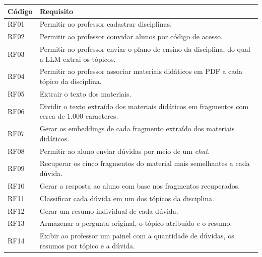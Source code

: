 \begin{quadro}[H]\captionsetup{name=Quadro}
\centering
\caption{Requisitos funcionais}
\label{quad:requisitos-funcionais}

\renewcommand{\arraystretch}{1.3}
\setlength{\tabcolsep}{4pt}

\begin{tabularx}{\textwidth}{
|>{\centering\arraybackslash}m{1.5cm}
|>{\raggedright\arraybackslash}X|
}
\hline

\rowcolor[HTML]{C0C0C0}
\textbf{Código} &
\textbf{Requisito} \\ \hline

RF01 & Permitir ao professor cadastrar disciplinas. \\ \hline

RF02 & Permitir ao professor convidar alunos por código de acesso. \\ \hline

RF03 & Permitir ao professor enviar o plano de ensino da disciplina, do qual a LLM extrai os tópicos. \\ \hline

RF04 & Permitir ao professor associar materiais didáticos em PDF a cada tópico da disciplina. \\ \hline

RF05 & Extrair o texto dos materiais. \\ \hline

RF06 & Dividir o texto extraído dos materiais didáticos em fragmentos com cerca de 1.000 caracteres. \\ \hline

RF07 & Gerar os embeddings de cada fragmento extraído dos materiais didáticos. \\ \hline

RF08 & Permitir ao aluno enviar dúvidas por meio de um \textit{chat}. \\ \hline

RF09 & Recuperar os cinco fragmentos do material mais semelhantes a cada dúvida. \\ \hline

RF10 & Gerar a resposta ao aluno com base nos fragmentos recuperados. \\ \hline

RF11 & Classificar cada dúvida em um dos tópicos da disciplina. \\ \hline

RF12 & Gerar um resumo individual de cada dúvida. \\ \hline

RF13 & Armazenar a pergunta original, o tópico atribuído e o resumo. \\ \hline

RF14 & Exibir ao professor um painel com a quantidade de dúvidas, os resumos por tópico e a dúvida. \\ \hline
\end{tabularx}
\vspace{-0.2cm}
{\fontsize{10pt}{12pt}\selectfont
\caption*{Fonte: Elaborado pela autora (2026).} %
}
\end{quadro}

